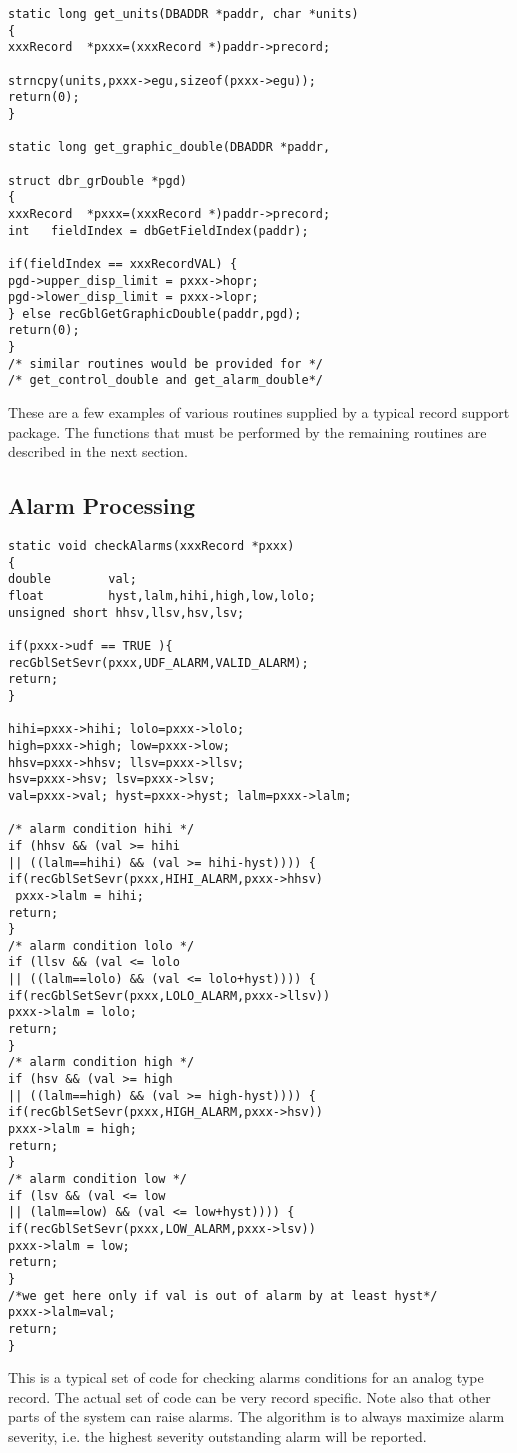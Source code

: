 \begin{verbatim}static long get_units(DBADDR *paddr, char *units)
{
xxxRecord  *pxxx=(xxxRecord *)paddr->precord;

strncpy(units,pxxx->egu,sizeof(pxxx->egu));
return(0);
}

static long get_graphic_double(DBADDR *paddr,

struct dbr_grDouble *pgd)
{
xxxRecord  *pxxx=(xxxRecord *)paddr->precord;
int   fieldIndex = dbGetFieldIndex(paddr);

if(fieldIndex == xxxRecordVAL) {
pgd->upper_disp_limit = pxxx->hopr;
pgd->lower_disp_limit = pxxx->lopr;
} else recGblGetGraphicDouble(paddr,pgd);
return(0);
}
/* similar routines would be provided for */
/* get_control_double and get_alarm_double*/
\end{verbatim}
These are a few examples of various routines supplied by a typical record support package. The functions that must be 
performed by the remaining routines are described in the next section.

\subsection{Alarm Processing}

\begin{verbatim}static void checkAlarms(xxxRecord *pxxx)
{
double        val;
float         hyst,lalm,hihi,high,low,lolo;
unsigned short hhsv,llsv,hsv,lsv;

if(pxxx->udf == TRUE ){
recGblSetSevr(pxxx,UDF_ALARM,VALID_ALARM);
return;
}

hihi=pxxx->hihi; lolo=pxxx->lolo;
high=pxxx->high; low=pxxx->low;
hhsv=pxxx->hhsv; llsv=pxxx->llsv;
hsv=pxxx->hsv; lsv=pxxx->lsv;
val=pxxx->val; hyst=pxxx->hyst; lalm=pxxx->lalm;

/* alarm condition hihi */
if (hhsv && (val >= hihi 
|| ((lalm==hihi) && (val >= hihi-hyst)))) {
if(recGblSetSevr(pxxx,HIHI_ALARM,pxxx->hhsv)
 pxxx->lalm = hihi;
return;
}
/* alarm condition lolo */
if (llsv && (val <= lolo 
|| ((lalm==lolo) && (val <= lolo+hyst)))) {
if(recGblSetSevr(pxxx,LOLO_ALARM,pxxx->llsv))
pxxx->lalm = lolo;
return;
}
/* alarm condition high */
if (hsv && (val >= high 
|| ((lalm==high) && (val >= high-hyst)))) {
if(recGblSetSevr(pxxx,HIGH_ALARM,pxxx->hsv))
pxxx->lalm = high;
return;
}
/* alarm condition low */
if (lsv && (val <= low 
|| (lalm==low) && (val <= low+hyst)))) {
if(recGblSetSevr(pxxx,LOW_ALARM,pxxx->lsv))
pxxx->lalm = low;
return;
}
/*we get here only if val is out of alarm by at least hyst*/
pxxx->lalm=val;
return;
}
\end{verbatim}This is a typical set of code for checking alarms conditions for an analog type record. The actual set of code can be very 
record specific. Note also that other parts of the system can raise alarms. The algorithm is to always maximize alarm 
severity, i.e. the highest severity outstanding alarm will be reported.

